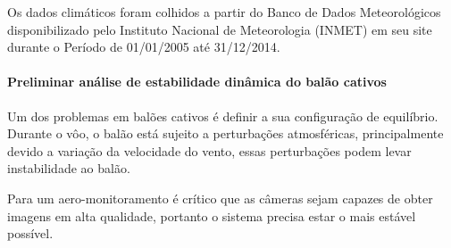     Os dados climáticos foram colhidos a partir do Banco de Dados Meteorológicos disponibilizado pelo Instituto Nacional de Meteorologia (INMET) em seu site durante o Período de 01/01/2005 até 31/12/2014.
    
    \paragraph{Preliminar análise de estabilidade dinâmica do balão cativos}
    Um dos problemas em balões cativos é definir a sua configuração de equilíbrio. Durante o vôo, o balão está sujeito a perturbações atmosféricas, principalmente devido a variação da velocidade do vento, essas perturbações podem levar instabilidade ao balão.
    
    Para um aero-monitoramento é crítico que as câmeras sejam capazes de obter imagens em alta qualidade, portanto o sistema precisa estar o mais estável possível.
    
  
  
  
